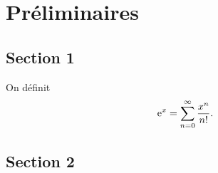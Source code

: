 \chapter{Préliminaires}
\label{ch:prelim}


\section{Section 1}

On définit
\begin{equation}
  \label{eq:exp}
  \e^x = \sum_{n=0}^\infty \frac{x^n}{n!}.
\end{equation}


\section{Section 2}



\endinput
